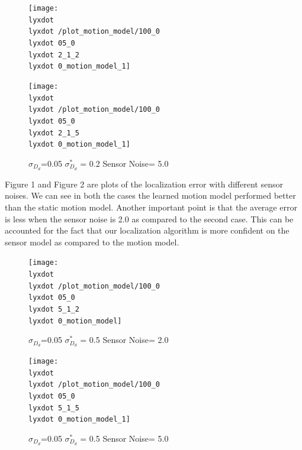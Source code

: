 \documentclass[12pt]{dalcsthesis}
\begin{document}
{\begin{figure}
\texttt{[image: \\lyxdot \\lyxdot /plot\_motion\_model/100\_0\\lyxdot 05\_0\\lyxdot 2\_1\_2\\lyxdot 0\_motion\_model\_1]}
\end{figure}


\begin{figure}
\caption{$\sigma_{D_{d}}$=0.05 $\sigma_{D_{d}}^{*}$ = 0.2 Sensor Noise= 5.0}


\texttt{[image: \\lyxdot \\lyxdot /plot\_motion\_model/100\_0\\lyxdot 05\_0\\lyxdot 2\_1\_5\\lyxdot 0\_motion\_model\_1]}

\end{figure}


Figure 1 and Figure 2 are plots of the localization error with different
sensor noises. We can see in both the cases the learned motion model
performed better than the static motion model. Another important point
is that the average error is less when the sensor noise is 2.0 as
compared to the second case. This can be accounted for the fact that
our localization algorithm is more confident on the sensor model as
compared to the motion model. 

\begin{figure}
\caption{$\sigma_{D_{d}}$=0.05 $\sigma_{D_{d}}^{*}$ = 0.5 Sensor Noise= 2.0}


\texttt{[image: \\lyxdot \\lyxdot /plot\_motion\_model/100\_0\\lyxdot 05\_0\\lyxdot 5\_1\_2\\lyxdot 0\_motion\_model]}

\end{figure}


\begin{figure}
\caption{$\sigma_{D_{d}}$=0.05 $\sigma_{D_{d}}^{*}$ = 0.5 Sensor Noise= 5.0}


\texttt{[image: \\lyxdot \\lyxdot /plot\_motion\_model/100\_0\\lyxdot 05\_0\\lyxdot 5\_1\_5\\lyxdot 0\_motion\_model\_1]}


\end{figure}}
\end{document}
